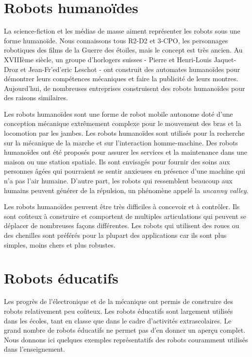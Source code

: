 \section{Robots humanoïdes}

La science-fiction et les médias de masse aiment représenter les robots sous une forme humanoïde. Nous connaissons tous R2-D2 et 3-CPO, les personnages robotiques des films de la Guerre des étoiles, mais le concept est très ancien. Au XVIIIème siècle, un groupe d'horlogers suisses - Pierre et Henri-Louis Jaquet-Droz et Jean-Fr'{e}d'{e}ric Leschot - ont construit des automates humanoïdes pour démontrer leurs compétences mécaniques et faire la publicité de leurs montres. Aujourd'hui, de nombreuses entreprises construisent des robots humanoïdes pour des raisons similaires.

Les robots humanoïdes sont une forme de robot mobile autonome doté d'une conception mécanique extrêmement complexe pour le mouvement des bras et la locomotion par les jambes. Les robots humanoïdes sont utilisés pour la recherche sur la mécanique de la marche et sur l'interaction homme-machine. Des robots humanoïdes ont été proposés pour assurer les services et la maintenance dans une maison ou une station spatiale. Ils sont envisagés pour fournir des soins aux personnes âgées qui pourraient se sentir anxieuses en présence d'une machine qui n'a pas l'air humaine. D'autre part, les robots qui ressemblent beaucoup aux humains peuvent générer de la répulsion, un phénomène appelé la \emph{uncanny valley}.

Les robots humanoïdes peuvent être très difficiles à concevoir et à contrôler. Ils sont coûteux à construire et comportent de multiples articulations qui peuvent se déplacer de nombreuses façons différentes. Les robots qui utilisent des roues ou des chenilles sont préférés pour la plupart des applications car ils sont plus simples, moins chers et plus robustes.

\section{Robots éducatifs}\label{s.educational}

Les progrès de l'électronique et de la mécanique ont permis de construire des robots relativement peu coûteux. Les robots éducatifs sont largement utilisés dans les écoles, tant en classe que dans le cadre d'activités extrascolaires. Le grand nombre de robots éducatifs ne permet pas d'en donner un aperçu complet. Nous donnons ici quelques exemples représentatifs des robots couramment utilisés dans l'enseignement.

